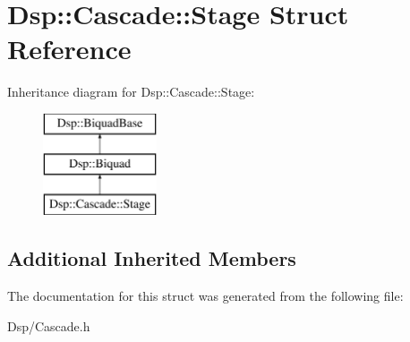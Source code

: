 \hypertarget{structDsp_1_1Cascade_1_1Stage}{\section{Dsp\-:\-:Cascade\-:\-:Stage Struct Reference}
\label{structDsp_1_1Cascade_1_1Stage}
}
Inheritance diagram for Dsp\-:\-:Cascade\-:\-:Stage\-:\begin{figure}[H]
\begin{center}
\leavevmode
\includegraphics[height=3.000000cm]{structDsp_1_1Cascade_1_1Stage}
\end{center}
\end{figure}
\subsection*{Additional Inherited Members}


The documentation for this struct was generated from the following file\-:\begin{DoxyCompactItemize}
\item 
Dsp/Cascade.\-h\end{DoxyCompactItemize}
